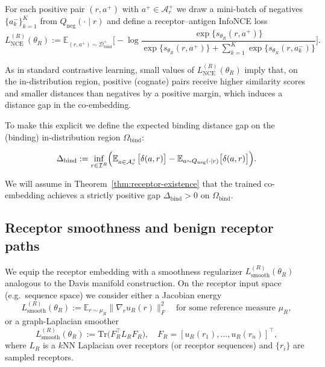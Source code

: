 \documentclass[11pt]{article}
\newcommand{\Ical}{\mathcal{I}}
\newcommand{\Dcal}{\mathcal{D}}
\newcommand{\Acal}{\mathcal{A}}
\newcommand{\E}{\mathbb{E}}
\begin{document}
For each positive pair $(r,a^+)$ with $a^+ \in \Acal_r^+$ we draw a mini-batch
of negatives $\{a_k^-\}_{k=1}^K$ from $Q_{\mathrm{neg}}(\cdot\mid r)$ and
define a receptor–antigen InfoNCE loss
\begin{equation}
  L_{\mathrm{NCE}}^{(R)}(\theta_R)
  := \E_{(r,a^+) \sim \Dcal_{\mathrm{bind}}^+}
     \Biggl[
       -\log
       \frac{\exp\bigl\{s_{\theta_R}(r,a^+)\bigr\}}
            {\exp\bigl\{s_{\theta_R}(r,a^+)\bigr\}
              + \sum_{k=1}^K
                   \exp\bigl\{s_{\theta_R}(r,a_k^-)\bigr\}}
     \Biggr].
  \label{eq:InfoNCE-R}
\end{equation}

As in standard contrastive learning, small values of
$L_{\mathrm{NCE}}^{(R)}(\theta_R)$ imply that, on the in-distribution region,
positive (cognate) pairs receive higher similarity scores and smaller distances
than negatives by a positive margin, which induces a distance gap in the
co-embedding.

To make this explicit we define the expected binding distance gap on the
(binding) in-distribution region $\Omega_{\mathrm{bind}}$:

\begin{equation}
  \Delta_{\mathrm{bind}}
    := \inf_{r \in \Ical^R}
      \Bigl(
        \E_{a \in \Acal_r^+} \bigl[ \delta(a,r) \bigr]
        - \E_{a \sim Q_{\mathrm{neg}}(\cdot\mid r)}
           \bigl[ \delta(a,r) \bigr]
      \Bigr).
  \label{eq:Delta-bind}
\end{equation}

We will assume in Theorem~\ref{thm:receptor-existence} that the trained
co-embedding achieves a strictly positive gap $\Delta_{\mathrm{bind}}>0$ on
$\Omega_{\mathrm{bind}}$.

\subsection{Receptor smoothness and benign receptor paths}
\label{subsec:receptor-paths}

We equip the receptor embedding with a smoothness regularizer
$L_{\mathrm{smooth}}^{(R)}(\theta_R)$ analogous to the Davis manifold
construction. On the receptor input space (e.g.\ sequence space) we consider
either a Jacobian energy
\begin{equation}
  L_{\mathrm{smooth}}^{(R)}(\theta_R)
    := \E_{r \sim \mu_R}
          \bigl\| \nabla_r u_R(r) \bigr\|_F^2
  \quad\text{for some reference measure $\mu_R$},
  \label{eq:smooth-jacobian}
\end{equation}
or a graph-Laplacian smoother
\begin{equation}
  L_{\mathrm{smooth}}^{(R)}(\theta_R)
    := \mathrm{Tr}\bigl( F_R^\top L_R F_R \bigr),
  \quad
  F_R = [u_R(r_1),\dots,u_R(r_n)]^\top,
  \label{eq:smooth-laplacian}
\end{equation}
where $L_R$ is a $k$NN Laplacian over receptors (or receptor sequences)
and $\{r_i\}$ are sampled receptors.
\end{document}
